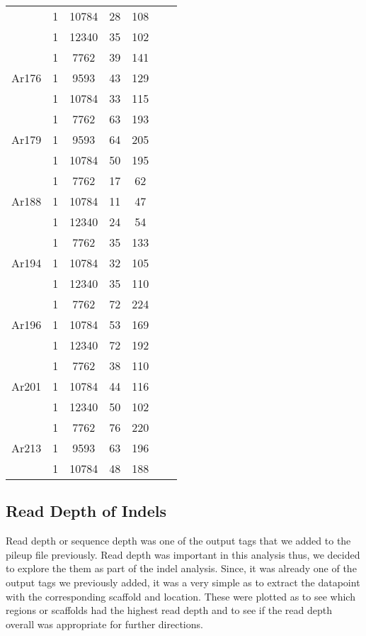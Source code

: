 \documentclass[12pt]{article}
\begin{document}
\begin{table}[H]
\begin{center}
\begin{singlespace}
{\begin{tabular}{ |c|c|c|c|c|c|c| }
					& 1 & 10784 & 28 & 108  \\ 
					& 1 & 12340 & 35 & 102 \\ 
					\hline
					\multirow{3}{4em}{Ar176} & 1 & 7762 & 39 & 141 \\ 
					& 1 & 9593 & 43 & 129  \\ 
					& 1 & 10784 & 33 & 115 \\ 
					\hline
					\multirow{3}{4em}{Ar179} & 1 & 7762 & 63 & 193 \\ 
					& 1 & 9593 & 64 & 205  \\ 
					& 1 & 10784 & 50 & 195 \\ 
					\hline
					\multirow{3}{4em}{Ar188} & 1 & 7762 & 17 & 62 \\ 
					& 1 & 10784 & 11 & 47  \\ 
					& 1 & 12340 & 24 & 54 \\ 
					\hline
					\multirow{3}{4em}{Ar194} & 1 & 7762 & 35 & 133 \\ 
					& 1 & 10784 & 32 & 105  \\ 
					& 1 & 12340 & 35 & 110 \\ 
					\hline
					\multirow{3}{4em}{Ar196} & 1 & 7762 & 72 & 224 \\ 
					& 1 & 10784 & 53 & 169  \\ 
					& 1 & 12340 & 72 & 192 \\ 
					\hline
					\multirow{3}{4em}{Ar201} & 1 & 7762 & 38 & 110 \\ 
					& 1 & 10784 & 44 & 116  \\ 
					& 1 & 12340 & 50 & 102 \\ 
					\hline
					\multirow{3}{4em}{Ar213} & 1 & 7762 & 76 & 220 \\ 
					& 1 & 9593 & 63 & 196  \\ 
					& 1 & 10784 & 48 & 188 \\ 
					\hline
				\end{tabular}
			}
		\end{singlespace}
	\end{center}
\end{table}

\subsection{Read Depth of Indels}

Read depth or sequence depth was one of the output tags that we added to the pileup file previously. Read depth was important in this analysis thus, we decided to explore the them as part of the indel analysis. Since, it was already one of the output tags we previously added, it was a very simple as to extract the datapoint with the corresponding scaffold and location. These were plotted as to see which regions or scaffolds had the highest read depth and to see if the read depth overall was appropriate for further directions.
\end{document}
